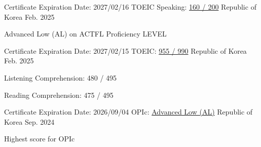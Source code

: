 

\begin{cventries}

  \cventry
    {Certificate Expiration Date: 2027/02/16} %
    {TOEIC Speaking: \href{https://drive.google.com/file/d/1HgNQ4gUgvdH7-rlSQieMzz84lg-ij9-u/view?usp=sharing}{160 / 200}} %
    {Republic of Korea} %
    {Feb. 2025} %
    {
      \begin{cvitems} %
        \item {Advanced Low (AL) on ACTFL Proficiency LEVEL}
      \end{cvitems}
    }

  \cventry
    {Certificate Expiration Date: 2027/02/15} %
    {TOEIC: \href{https://drive.google.com/file/d/14gmf1MtT_eW6QlUEyug6A36HshiLP5mz/view?usp=sharing}{955 / 990}} %
    {Republic of Korea} %
    {Feb. 2025} %
    {
      \begin{cvitems} %
        \item {Listening Comprehension: 480 / 495}
        \item {Reading Comprehension: 475 / 495}
      \end{cvitems}
    }

  \cventry
    {Certificate Expiration Date: 2026/09/04} %
    {OPIc: \href{https://drive.google.com/file/d/1WA33mSp0jaU5LKnqtJ-dRN5UOLOgsfLA/view?usp=sharing}{Advanced Low (AL)}} %
    {Republic of Korea} %
    {Sep. 2024} %
    {
      \begin{cvitems} %
        \item {Highest score for OPIc}
      \end{cvitems}
    }


\end{cventries}
